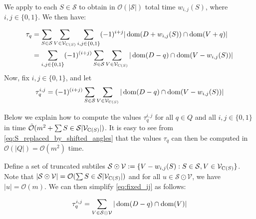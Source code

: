 \documentclass[11pt, letterpaper]{article}
\theoremstyle{plain}
\theoremstyle{definition}
\theoremstyle{remark}
\renewcommand{\O}{\mathcal{O}}
\newcommand{\tO}{\tilde{\mathcal{O}}}
\renewcommand{\S}{\mathcal{S}}
\newcommand{\V}{\mathcal{V}}
\begin{document}

We apply  to each $S\in \S$ to obtain in $\O(|\S|)$ total time $w_{i, j}(S)$, where $i,j \in \{0,1\}$. We then have:

\begin{align}
\label{eq:S_replaced_by_shifted_angles}
\begin{split}
\tau_q &= \sum_{S \in \S} \sum_{V \in \V_{\getchar{S}}} \sum_{i,j \in \{0,1\}} (-1)^{i+j} |\d{D+w_{i, j}(S)} \cap \d{V + q}| \\
& = \sum_{i,j \in \{0,1\}} (-1)^{(i+j)} \sum_{S \in \S} \sum_{V \in \V_{\getchar{S}}} |\d{D-q} \cap \d{V-w_{i, j}(S)}|
\end{split}
\end{align}
%
Now, fix $i,j \in \{0,1\}$, and let 
%
\begin{equation}
\label{eq:fixed_ij}
\tau_q^{i,j} = (-1)^{(i+j)} \sum_{S \in \S} \sum_{V \in \V_{\getchar{S}}} |\d{D-q} \cap \d{V-w_{i, j}(S)}|
\end{equation}

Below we explain how to compute the values $\tau_q^{i,j}$ for all $q \in Q$ and all $i,j \in \{0,1\}$ in time $\tO(m^2 + \sum{S \in \S} |\V_{\getchar{S}}|)$. It is easy to see from \cref{eq:S_replaced_by_shifted_angles} that the values $\tau_q$ can then be computed in $\O(|Q|) = \O(m^2)$ time. 

Define a set of truncated subtiles $\S \odot \V := \{V-w_{i, j}(S) : S \in \S, V \in \V_{\getchar{S}}\}$.  Note that $|\S \odot \V| = \O(\sum{S \in \S} |\V_{\getchar{S}}|)$ and for all $u \in \S \odot \V$, we have $|u| = \O(m)$. We can then simplify \cref{eq:fixed_ij} as follows:

\begin{align}
\label{eq:group_by_gamma}
\tau_q^{i,j} = \sum_{V \in \S \odot \V} |\d{D-q} \cap \d{V}|
\end{align}
\end{document}
